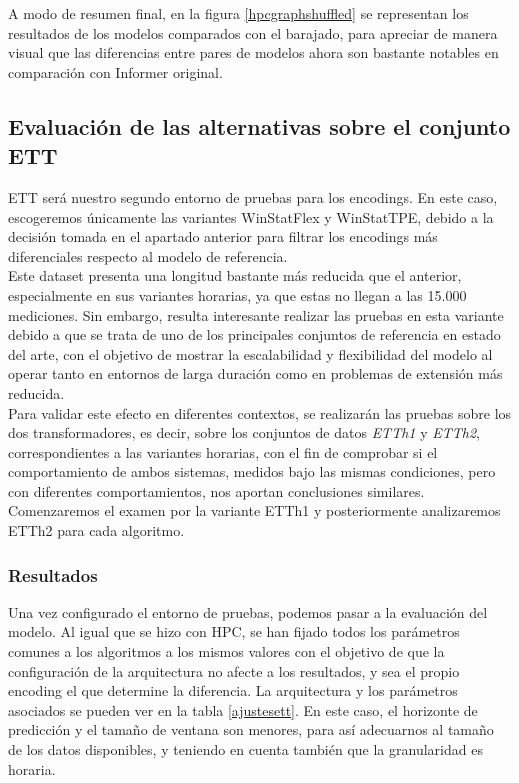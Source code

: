 A modo de resumen final, en la figura \ref{hpcgraphshuffled} se representan los resultados de los modelos comparados con el barajado, para apreciar de manera visual que las diferencias entre pares de modelos ahora son bastante notables en comparación con Informer original.


\subsection{Evaluación de las alternativas sobre el conjunto ETT}

ETT será nuestro segundo entorno de pruebas para los encodings. En este caso, escogeremos únicamente las variantes WinStatFlex y WinStatTPE, debido a la decisión tomada en el apartado anterior para filtrar los encodings más diferenciales respecto al modelo de referencia. \\

Este dataset presenta una longitud bastante más reducida que el anterior, especialmente en sus variantes horarias, ya que estas no llegan a las 15.000 mediciones. Sin embargo, resulta interesante realizar las pruebas en esta variante debido a que se trata de uno de los principales conjuntos de referencia en estado del arte, con el objetivo de mostrar la escalabilidad y flexibilidad del modelo al operar tanto en entornos de larga duración como en problemas de extensión más reducida.\\

 Para validar este efecto en diferentes contextos, se realizarán las pruebas sobre los dos transformadores, es decir, sobre los conjuntos de datos \textit{ETTh1} y \textit{ETTh2}, correspondientes a las variantes horarias, con el fin de comprobar si el comportamiento de ambos sistemas, medidos bajo las mismas condiciones, pero con diferentes comportamientos, nos aportan conclusiones similares. Comenzaremos el examen por la variante ETTh1 y posteriormente analizaremos ETTh2 para cada algoritmo.


\subsubsection{Resultados}

Una vez configurado el entorno de pruebas, podemos pasar a la evaluación del modelo. Al igual que se hizo con HPC, se han fijado todos los parámetros comunes a los algoritmos a los mismos valores con el objetivo de que la configuración de la arquitectura no afecte a los resultados, y sea el propio encoding el que determine la diferencia. La arquitectura y los parámetros asociados se pueden ver en la tabla \ref{ajustesett}. En este caso, el horizonte de predicción y el tamaño de ventana son menores, para así adecuarnos al tamaño de los datos disponibles, y teniendo en cuenta también que la granularidad es horaria.

